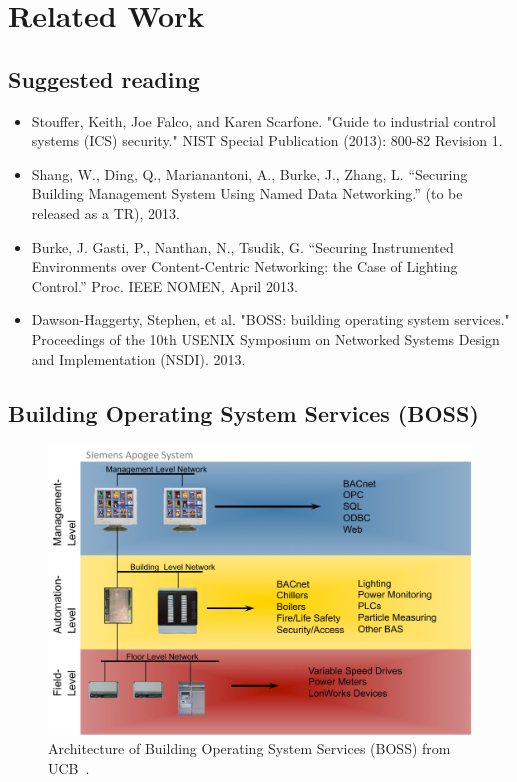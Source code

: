 \section{Related Work}


\subsection{Suggested reading}

\begin{itemize}
\item Stouffer, Keith, Joe Falco, and Karen Scarfone. "Guide to industrial control systems (ICS) security." NIST Special Publication (2013): 800-82 Revision 1.

\item Shang, W., Ding, Q., Marianantoni, A., Burke, J., Zhang, L. “Securing Building Management System Using Named Data Networking.”  (to be 
released as a TR), 2013. 

\item Burke, J. Gasti, P., Nanthan, N., Tsudik, G. “Securing Instrumented Environments over Content-Centric Networking: the Case of Lighting Control.”  Proc. IEEE NOMEN, April 2013. 

\item Dawson-Haggerty, Stephen, et al. "BOSS: building operating system services." Proceedings of the 10th USENIX Symposium on Networked Systems Design and Implementation (NSDI). 2013.
\end{itemize}

\subsection{Building Operating System Services (BOSS)} 

\begin{figure}
\begin{center}
\includegraphics[width=.6\textwidth]{figures/siemens-apogee-levels}
\caption{Architecture of Building Operating System Services (BOSS) from UCB~\cite{Dawson-Haggerty2013BOSS}.} 
\label{fig:BOSS}
\end{center}
\end{figure}

